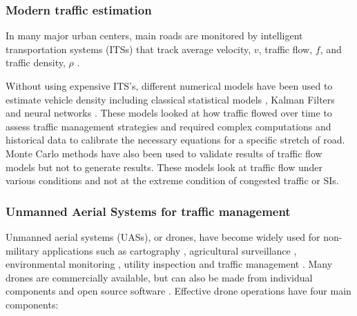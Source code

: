 \subsubsection{Modern traffic estimation}

In many major urban centers, main roads are monitored by intelligent transportation systems (ITSs) that track average velocity, $v$, traffic flow, $f$, and traffic density, $\rho$ \citep{Wu2007, Abtahi2011, Bartosz2015}.

Without using expensive ITS's, different numerical models have been used to estimate vehicle density including classical statistical models \citep{Schreckenberg1995}, Kalman Filters \citep{Pourmoallem1997, Sun2004} and neural networks \citep{Ghosh-Dastidar2006}.  These models looked at how traffic flowed over time to assess traffic management strategies and required complex computations and historical data to calibrate the necessary equations for a specific stretch of road.  Monte Carlo methods have also been used to validate results of traffic flow models \citep{Mihaylova2004} but not to generate results.  These models look at traffic flow under various conditions and not at the extreme condition of congested traffic or SIs. 

\subsubsection{Unmanned Aerial Systems for traffic management} 
Unmanned aerial systems (UASs), or drones, have become widely used for non-military applications such as cartography \citep{Saadatseresht2015}, agricultural surveillance \citep{Saari2017}, environmental monitoring \citep{Capolupo2015}, utility inspection \citep{Day2017, Gomez2017} and traffic management \citep{Ahmadi2017, 2017, Salvo2017, Liu2013}. Many drones are commercially available, but can also be made from individual components and open source software \citep{Sharma2016a}.  Effective drone operations have four main components:

